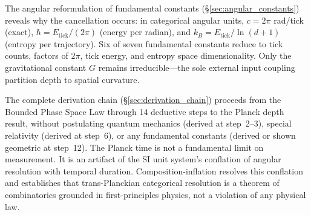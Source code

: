\documentclass[twocolumn,10pt,a4paper]{article}
\theoremstyle{definition}
\theoremstyle{remark}
\begin{document}
The angular reformulation of fundamental constants (\S\ref{sec:angular_constants}) reveals why the cancellation occurs: in categorical angular units, $c = 2\pi$ rad/tick (exact), $\hbar = E_{\text{tick}}/(2\pi)$ (energy per radian), and $k_B = E_{\text{tick}}/\ln(d+1)$ (entropy per trajectory). Six of seven fundamental constants reduce to tick counts, factors of $2\pi$, tick energy, and entropy space dimensionality. Only the gravitational constant $G$ remains irreducible---the sole external input coupling partition depth to spatial curvature.

The complete derivation chain (\S\ref{sec:derivation_chain}) proceeds from the Bounded Phase Space Law through 14 deductive steps to the Planck depth result, without postulating quantum mechanics (derived at step~2--3), special relativity (derived at step~6), or any fundamental constants (derived or shown geometric at step~12). The Planck time is not a fundamental limit on measurement. It is an artifact of the SI unit system's conflation of angular resolution with temporal duration. Composition-inflation resolves this conflation and establishes that trans-Planckian categorical resolution is a theorem of combinatorics grounded in first-principles physics, not a violation of any physical law.


\end{document}
